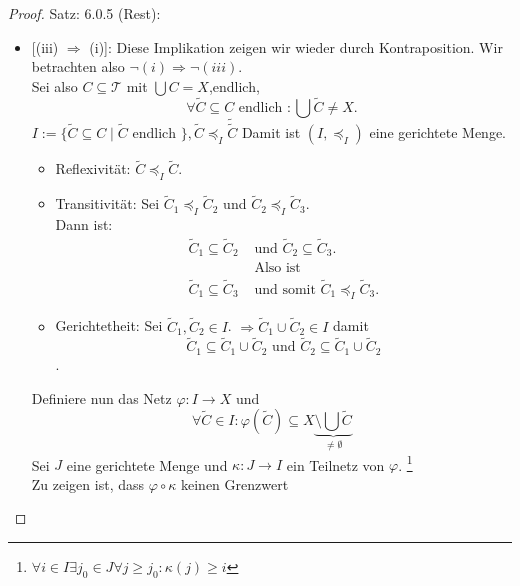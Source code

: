 \begin{proof}{Satz: 6.0.5 (Rest):}\\
\begin{itemize}
  \item{[(iii) $\Rightarrow$ (i)]}:
    Diese Implikation zeigen wir wieder durch Kontraposition. Wir betrachten also
    $\neg (i) \Rightarrow \neg (iii)$.\\
    Sei also $C \subseteq \mathcal{T}$ mit $\bigcup C = X$,endlich,
    $$
    \forall \tilde{C} \subseteq C \text{ endlich }: \bigcup \tilde{C} \neq X .
    $$
    $I:=\{\tilde{C}\subseteq C\mid \tilde{C}\text{ endlich }\}, \tilde{C} \preceq_I \tilde{\tilde{C}}$
    Damit ist $(I, \preceq_I)$ eine gerichtete Menge.\\
    \begin{itemize}
        \item Reflexivität: $\tilde{C} \preceq_I \tilde{C}$.
        \item Transitivität: Sei $\tilde{C}_1 \preceq_I \tilde{C}_2$ und 
        $\tilde{C}_2 \preceq_I \tilde{C}_3$. \\
        Dann ist:
        \begin{equation*}
        \begin{split}
        \tilde{C}_1 \subseteq \tilde{C}_2 &\text{ und } 
        \tilde{C}_2 \subseteq \tilde{C}_3.\\
        &\text{ Also ist } \\
        \tilde{C}_1 \subseteq \tilde{C}_3 &\text{ und somit } 
        \tilde{C}_1 \preceq_I \tilde{C}_3.
        \end{split}
        \end{equation*}
        \item Gerichtetheit: Sei $\tilde{C}_1, \tilde{C}_2 \in I$.
        $\Rightarrow \tilde{C}_1 \cup\tilde{C}_2 \in I$ damit \\
        $$
        \tilde{C}_1 \subseteq \tilde{C}_1 \cup \tilde{C}_2 \text{ und }
        \tilde{C}_2 \subseteq \tilde{C}_1 \cup \tilde{C}_2
        $$.
        \end{itemize}
    Definiere nun das Netz $\varphi : I \to X$ und 
    $$
    \forall \tilde{C} \in I: \varphi(\tilde{C}) \subseteq X 
    \underbrace{\setminus\bigcup \tilde{C}}_{\neq \emptyset}
    $$
    Sei $J$ eine gerichtete Menge und $\kappa : J \to I$ 
    ein Teilnetz von $\varphi$.
    \footnote{ $\forall i \in I \exists j_0 \in J \forall j \geq j_0: \kappa(j)\geq i$}\\
    Zu zeigen ist, dass $\varphi \circ \kappa$ keinen Grenzwert

\end{itemize}
\end{proof}
